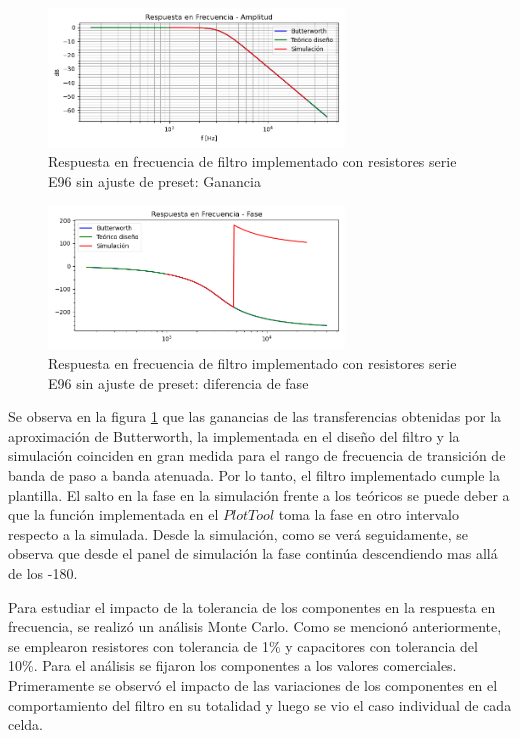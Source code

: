 \begin{figure}[H]
    \centering
    \includegraphics[width= 0.7\textwidth]{../Ejercicio2-DisenoDeCeldas/1CeldaSallenKey/images/SKGain.png}
    \caption{Respuesta en frecuencia de filtro implementado con resistores serie E96 sin ajuste de preset: Ganancia}
    \label{fig:SKGain}
\end{figure}

\begin{figure}[H]
    \centering
    \includegraphics[width= 0.7\textwidth]{../Ejercicio2-DisenoDeCeldas/1CeldaSallenKey/images/SKphase.png}
    \caption{Respuesta en frecuencia de filtro implementado con resistores serie E96 sin ajuste de preset: diferencia de fase}
    \label{fig:SKphase}
\end{figure}

Se observa en la figura \ref{fig:SKGain} que las ganancias de las transferencias obtenidas por la aproximación de Butterworth, la implementada en el diseño del filtro y la simulación coinciden en gran medida para el rango de frecuencia de transición de banda de paso a banda atenuada. Por lo tanto, el filtro implementado cumple la plantilla. El salto en la fase en la simulación frente a los teóricos se puede deber a que la función implementada en el $Plot Tool$ toma la fase en otro intervalo respecto a la simulada. Desde la simulación, como se verá seguidamente, se observa que desde el panel de simulación la fase continúa descendiendo mas allá de los -180\circ.

Para estudiar el impacto de la tolerancia de los componentes en la respuesta en frecuencia, se realizó un análisis Monte Carlo. Como se mencionó anteriormente, se emplearon resistores con tolerancia de 1\% y capacitores con tolerancia del 10\%. Para el análisis se fijaron los componentes a los valores comerciales. Primeramente se observó el impacto de las variaciones de los componentes en el comportamiento del filtro en su totalidad y luego se vio el caso individual de cada celda. 

